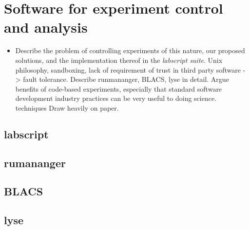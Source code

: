 \chapter{Software for experiment control and analysis}

\begin{itemize}
\item Describe the problem of controlling experiments of this nature, our proposed solutions, and the implementation thereof in the \emph{labscript suite}. Unix philosophy, sandboxing, lack of requirement of trust in third party software -> fault tolerance. Describe runmananger, BLACS, lyse in detail. Argue benefits of code-based experiments, especially that standard software development industry practices can be very useful to doing science. techniques Draw heavily on paper.
\end{itemize}

\section{labscript}
\section{rumananger}
\section{BLACS}
\section{lyse}
